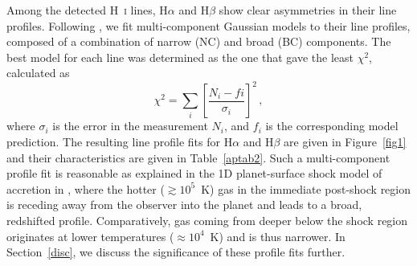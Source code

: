 \documentclass{aa}
\newcommand{\Ha}{\ensuremath{\mathrm{H}\alpha}\xspace}
\newcommand{\Hb}{\ensuremath{\mathrm{H}\beta}\xspace}
\newcommand{\Hi}{H~\textsc{i}\xspace}
\begin{document}
Among the detected \Hi lines, \Ha and \Hb show clear asymmetries in their line profiles. Following \cite{ringqvist2023}, we fit multi-component Gaussian models to their line profiles, composed of a combination of narrow (NC) and broad (BC) components. The best model for each line was determined as the one that gave the least $\chi^2$, calculated as
\begin{equation}
    \chi^2 = \sum_{i} \left[ \frac{N_i - fi}{\sigma_i} \right]^2\,,
\end{equation}
where $\sigma_i$ is the error in the measurement $N_i$, and $f_i$ is the corresponding model prediction. The resulting line profile fits for \Ha and \Hb are given in Figure~\ref{fig1} and their characteristics are given in Table~\ref{aptab2}. Such a multi-component profile fit is reasonable as explained in the 1D planet-surface shock model of accretion in \cite{aoyama2018, aoyama2020, aoyama2021}, where the hotter ($\gtrsim10^5$~K) gas in the immediate post-shock region is receding away from the observer into the planet and leads to a broad, redshifted profile. Comparatively, gas coming from deeper below the shock region originates at lower temperatures ($\approx10^4$~K) and is thus narrower. In Section~\ref{disc}, we discuss the significance of these profile fits further.
\end{document}
